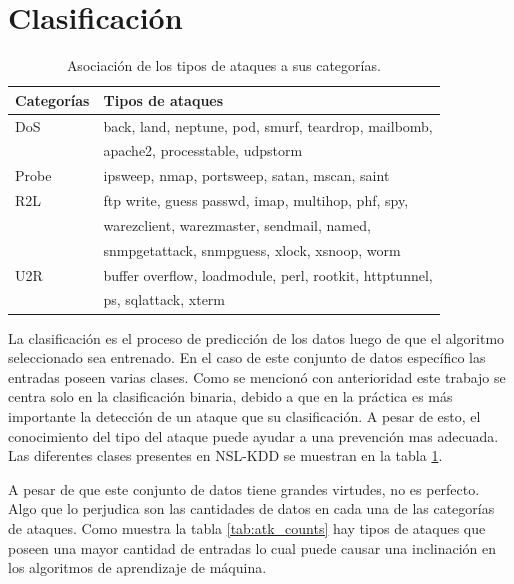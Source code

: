 \section{Clasificación}
\begin{table}[b]
    \begin{center}
        \caption{Asociación de los tipos de ataques a sus categorías.}
        
        \label{tab:class}
        \begin{tabular}{l|l} %
        \textbf{Categorías} & \textbf{Tipos de ataques}\\
        \hline
        DoS & back, land, neptune, pod, smurf, teardrop, mailbomb,\\ 
        & apache2, processtable, udpstorm\\
        Probe & ipsweep, nmap, portsweep, satan, mscan, saint\\
        R2L & ftp write, guess passwd, imap, multihop, phf, spy,\\
        & warezclient, warezmaster, sendmail, named,\\
        & snmpgetattack, snmpguess, xlock, xsnoop, worm\\
        U2R & buffer overflow, loadmodule, perl, rootkit, httptunnel,\\
        & ps, sqlattack, xterm\\
        \end{tabular}
    \end{center}
\end{table}

La clasificación es el proceso de predicción de los datos luego de que el algoritmo seleccionado sea entrenado. En el caso de este conjunto de datos específico las entradas poseen varias clases. Como se mencionó con anterioridad este trabajo se centra solo en la clasificación binaria, debido a que en la práctica es más importante la detección de un ataque que su clasificación. A pesar de esto, el conocimiento del tipo del ataque puede ayudar a una prevención mas adecuada. Las diferentes clases presentes en NSL-KDD se muestran en la tabla \ref{tab:class}.

A pesar de que este conjunto de datos tiene grandes virtudes, no es perfecto. Algo que lo perjudica son las cantidades de datos en cada una de las categorías de ataques. Como muestra la tabla \ref{tab:atk_counts} hay tipos de ataques que poseen una mayor cantidad de entradas lo cual puede causar una inclinación en los algoritmos de aprendizaje de máquina.

